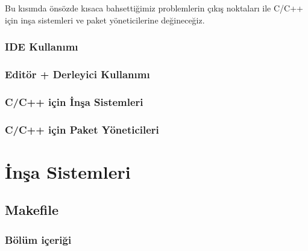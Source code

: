 \documentclass[
]{book}
\begin{document}
Bu kısımda önsözde kısaca bahsettiğimiz problemlerin çıkış noktaları ile C/C++ için inşa sistemleri ve paket yöneticilerine değineceğiz.

\hypertarget{ide-kullanux131mux131}{%
\section*{IDE Kullanımı}\label{ide-kullanux131mux131}}

\hypertarget{edituxf6r-derleyici-kullanux131mux131}{%
\section*{Editör + Derleyici Kullanımı}\label{edituxf6r-derleyici-kullanux131mux131}}

\hypertarget{cc-iuxe7in-inux15fa-sistemleri}{%
\section*{C/C++ için İnşa Sistemleri}\label{cc-iuxe7in-inux15fa-sistemleri}}

\hypertarget{cc-iuxe7in-paket-yuxf6neticileri}{%
\section*{C/C++ için Paket Yöneticileri}\label{cc-iuxe7in-paket-yuxf6neticileri}}

\hypertarget{part-inux15fa-sistemleri}{%
\part{İnşa Sistemleri}\label{part-inux15fa-sistemleri}}

\hypertarget{makefile}{%
\chapter*{Makefile}\label{makefile}}

\hypertarget{buxf6luxfcm-iuxe7eriux11fi-1}{%
\section*{Bölüm içeriği}\label{buxf6luxfcm-iuxe7eriux11fi-1}}
\end{document}
